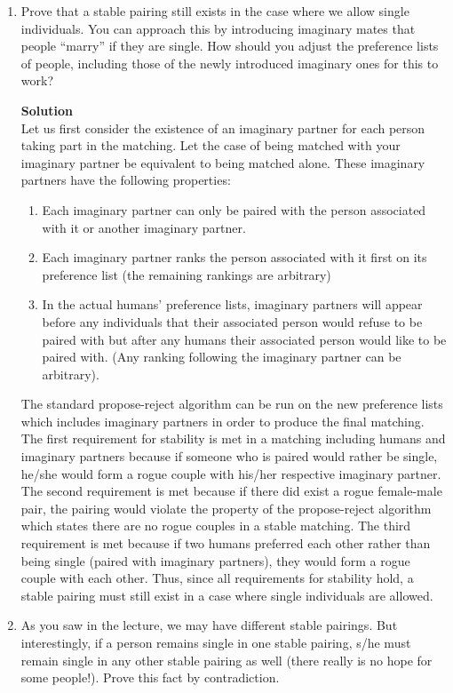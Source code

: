\documentclass[11pt]{article}
\newenvironment{Parts}{\begin{enumerate}[label=(\alph*)]}{\end{enumerate}}
\newcommand*{\Part}{\item}
\newenvironment{Answer}{\vspace{10pt}\begin{mdframed}\textbf{Solution}\\}{\end{mdframed}\vfill\pagebreak[3]}
\newenvironment{Answer}{\vspace{10pt}}{\vfill\pagebreak[3]}
\begin{document}
\begin{Parts}
\Part Prove that a stable pairing still exists in the case where we allow single individuals. You can approach this by
introducing imaginary mates that people ``marry''
if they are single. How should you adjust the preference lists of
people, including those of the newly introduced imaginary ones for
this to work?

\begin{Answer}
    Let us first consider the existence of an imaginary partner for each person taking part in the matching. Let the case of being matched with your imaginary partner be equivalent to being matched alone. These imaginary partners have the following properties:
    \begin{enumerate}
        \item Each imaginary partner can only be paired with the person associated with it or another imaginary partner.
        \item Each imaginary partner ranks the person associated with it first on its preference list (the remaining rankings are arbitrary)
        \item In the actual humans' preference lists, imaginary partners will appear before any individuals that their associated person would refuse to be paired with but after any humans their associated person would like to be paired with. (Any ranking following the imaginary partner can be arbitrary).
    \end{enumerate}
    The standard propose-reject algorithm can be run on the new preference lists which includes imaginary partners in order to produce the final matching.
The first requirement for stability is met in a matching including humans and imaginary partners because if someone who is paired would rather be single, he/she would form a rogue couple with his/her respective imaginary partner. The second requirement is met because if there did exist a rogue female-male pair, the pairing would violate the property of the propose-reject algorithm which states there are no rogue couples in a stable matching. The third requirement is met because if two humans preferred each other rather than being single (paired with imaginary partners), they would form a rogue couple with each other. Thus, since all requirements for stability hold, a stable pairing must still exist in a case where single individuals are allowed.
\end{Answer}
\Part As you saw in the lecture, we may have different stable pairings. But
interestingly, if a person remains single in one stable pairing, s/he
must remain single in any other stable pairing as well (there really
is no hope for some people!). Prove this fact by contradiction.


\end{Parts}
\end{document}

